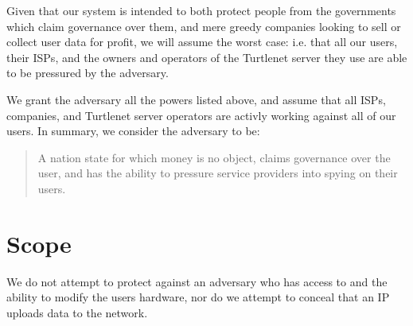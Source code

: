 Given that our system is intended to both protect people from the governments
which claim governance over them, and mere greedy companies looking to sell or
collect user data for profit, we will assume the worst case: i.e. that all
our users, their ISPs, and the owners and operators of the Turtlenet server they
use are able to be pressured by the adversary.

We grant the adversary all the powers listed above, and assume that
all ISPs, companies, and Turtlenet server operators are activly working against
all of our users. In summary, we consider the adversary to be:

\begin{quote}
\centering
A nation state for which money is no object, claims governance over the user,
and has the ability to pressure service providers into spying on their users.
\end{quote}

\section{Scope}
We do not attempt to protect against an adversary who has access to and the
ability to modify the users hardware, nor do we attempt to conceal that an IP
uploads data to the network.
